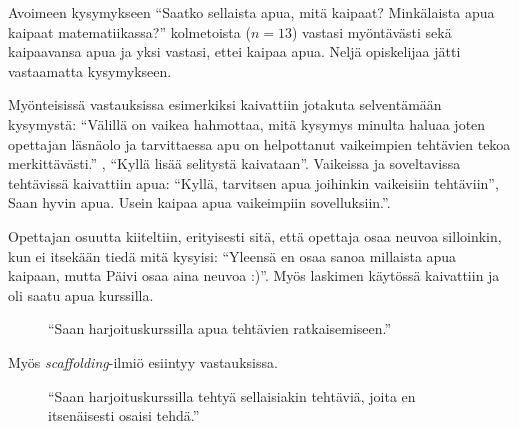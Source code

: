 Avoimeen kysymykseen ``Saatko sellaista apua, mitä kaipaat? Minkälaista apua kaipaat matematiikassa?'' kolmetoista ($n=13$) vastasi myöntävästi sekä kaipaavansa apua ja yksi vastasi, ettei kaipaa apua. Neljä opiskelijaa jätti vastaamatta kysymykseen. 

Myönteisissä vastauksissa esimerkiksi kaivattiin jotakuta selventämään kysymystä: ``Välillä on vaikea hahmottaa, mitä kysymys minulta haluaa joten opettajan läsnäolo ja tarvittaessa apu on helpottanut vaikeimpien tehtävien tekoa merkittävästi.'' , ``Kyllä lisää selitystä kaivataan''. Vaikeissa ja soveltavissa tehtävissä kaivattiin apua: ``Kyllä, tarvitsen apua joihinkin vaikeisiin tehtäviin'', Saan hyvin apua. Usein kaipaa apua vaikeimpiin sovelluksiin.''. 

Opettajan osuutta kiiteltiin, erityisesti sitä, että opettaja osaa neuvoa silloinkin, kun ei itsekään tiedä mitä kysyisi: ``Yleensä en osaa sanoa millaista apua kaipaan, mutta Päivi osaa aina neuvoa :)''. Myös laskimen käytössä kaivattiin ja oli saatu apua kurssilla. 

\begin{figure}[h!]
\centering
{}
\caption{``Saan harjoituskurssilla apua tehtävien ratkaisemiseen.''}
\end{figure}

Myös \emph{scaffolding}-ilmiö esiintyy vastauksissa.

\begin{figure}[h!]
\centering
{}
\caption{``Saan harjoituskurssilla tehtyä sellaisiakin tehtäviä, joita en itsenäisesti osaisi tehdä.''}
\end{figure}

